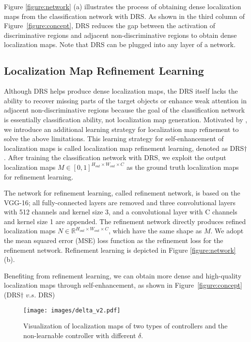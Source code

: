 \documentclass[letterpaper]{article} \usepackage{aaai21}  \usepackage{times}  \usepackage{helvet} \usepackage{courier}  \usepackage[hyphens]{url}  \usepackage{graphicx} \urlstyle{rm} \def\UrlFont{\rm}  \usepackage{natbib}  \usepackage{caption} \frenchspacing  \setlength{\pdfpagewidth}{8.5in}  \setlength{\pdfpageheight}{11in}
\begin{document}
Figure \ref{figure:network} (a) illustrates the process of obtaining dense localization maps from the classification network with DRS.
As shown in the third column of Figure~\ref{figure:concept}, DRS reduces the gap between the activation of discriminative regions and adjacent non-discriminative regions to obtain dense localization maps. 
Note that DRS can be plugged into any layer of a network.


\subsection{Localization Map Refinement Learning} 
\label{method:3}
Although DRS helps produce dense localization maps, the DRS itself lacks the ability to recover missing parts of the target objects or enhance weak attention in adjacent non-discriminative regions because the goal of the classification network is essentially classification ability, not localization map generation.
Motivated by \cite{jiang2019integral}, we introduce an additional learning strategy for localization map refinement to solve the above limitations.
This learning strategy for self-enhancement of localization maps is called localization map refinement learning, denoted as DRS$\dagger$.
After training the classification network with DRS, we exploit the output localization maps $M \in [0,1]^{H_{out} \times W_{out} \times C}$ as the ground truth localization maps for refinement learning.	

The network for refinement learning, called refinement network, is based on the VGG-16; all fully-connected layers are removed and three convolutional layers with 512 channels and kernel size 3, and a convolutional layer with C channels and kernel size 1 are appended.
The refinement network directly produces refined localization maps $N \in \mathbb{R}^{H_{out} \times W_{out} \times C}$, which have the same shape as $M$.
We adopt the mean squared error (MSE) loss function as the refinement loss for the refinement network.
Refinement learning is depicted in Figure \ref{figure:network} (b).

Benefiting from refinement learning, we can obtain more dense and high-quality localization maps through self-enhancement, as shown in Figure~\ref{figure:concept} (DRS$\dagger$ $v.s.$ DRS)


\begin{figure*}[t]
    \centering
    \texttt{[image: images/delta\_v2.pdf]}
    \caption{
        Visualization of localization maps of two types of controllers and the non-learnable controller with different $\delta$.
    }
    \label{figure:controller}
\end{figure*}
\end{document}
